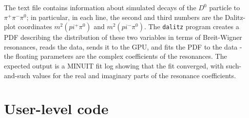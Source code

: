 \documentclass[12pt,pdflatex]{article}
\begin{document}
\begin{itemize}
The text file contains information about simulated decays of the
$D^0$ particle to $\pi^+\pi^-\pi^0$; in particular, in each line, the second and
third numbers are the Dalitz-plot coordinates $m^2(pi^+\pi^0)$ and
$m^2(pi^-\pi^0)$. The \texttt{dalitz} program creates a PDF describing the distribution of
these two variables in terms of Breit-Wigner resonances, 
reads the data, sends it to the GPU, and fits the PDF to the data
 - the floating parameters are the complex coefficients of the resonances.
The expected output is a MINUIT fit log showing that the fit
converged, with such-and-such values for the real and imaginary
parts of the resonance coefficients. 
\end{itemize}

\section{User-level code}
\label{sec:usercode}
\end{document}
